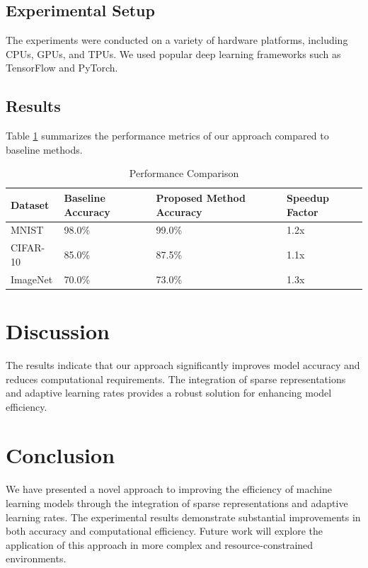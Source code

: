 \documentclass{article}
\begin{document}
\subsection{Experimental Setup}
The experiments were conducted on a variety of hardware platforms, including CPUs, GPUs, and TPUs. We used popular deep learning frameworks such as TensorFlow and PyTorch.

\subsection{Results}
Table \ref{tab:results} summarizes the performance metrics of our approach compared to baseline methods.

\begin{table}[ht]
\centering
\caption{Performance Comparison}
\label{tab:results}
\begin{tabular}{@{}llll@{}}
\toprule
Dataset & Baseline Accuracy & Proposed Method Accuracy & Speedup Factor \\ \midrule
MNIST   & 98.0\%            & 99.0\%                    & 1.2x             \\
CIFAR-10 & 85.0\%            & 87.5\%                    & 1.1x             \\
ImageNet & 70.0\%            & 73.0\%                    & 1.3x             \\ \bottomrule
\end{tabular}
\end{table}

\section{Discussion}
The results indicate that our approach significantly improves model accuracy and reduces computational requirements. The integration of sparse representations and adaptive learning rates provides a robust solution for enhancing model efficiency.

\section{Conclusion}
We have presented a novel approach to improving the efficiency of machine learning models through the integration of sparse representations and adaptive learning rates. The experimental results demonstrate substantial improvements in both accuracy and computational efficiency. Future work will explore the application of this approach in more complex and resource-constrained environments.
\end{document}
